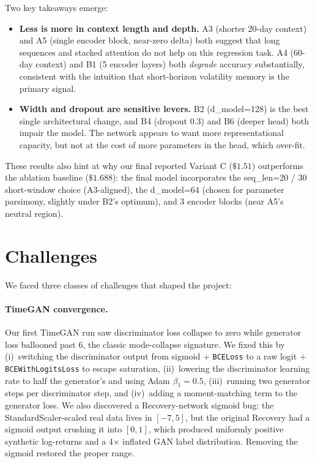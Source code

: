 \documentclass[conference]{IEEEtran}
\begin{document}
Two key takeaways emerge:
\begin{itemize}
\item \textbf{Less is more in context length and depth.} A3
(shorter 20-day context) and A5 (single encoder block, near-zero
delta) both suggest that long sequences and stacked attention
do not help on this regression task. A4 (60-day context) and
B1 (5 encoder layers) both \emph{degrade} accuracy
substantially, consistent with the intuition that short-horizon
volatility memory is the primary signal.
\item \textbf{Width and dropout are sensitive levers.} B2
(d\_model=128) is the best single architectural change, and B4
(dropout 0.3) and B6 (deeper head) both impair the model. The
network appears to want more representational capacity, but
not at the cost of more parameters in the head, which over-fit.
\end{itemize}

These results also hint at why our final reported Variant C
($\$1.51$) outperforms the ablation baseline ($\$1.688$): the
final model incorporates the seq\_len=20 / 30 short-window
choice (A3-aligned), the d\_model=64 (chosen for parameter
parsimony, slightly under B2's optimum), and 3 encoder blocks
(near A5's neutral region).

\section{Challenges}

We faced three classes of challenges that shaped the project:

\paragraph*{TimeGAN convergence.}
Our first TimeGAN run saw discriminator loss collapse to zero
while generator loss ballooned past 6, the classic
mode-collapse signature. We fixed this by (i)~switching the
discriminator output from sigmoid + \texttt{BCELoss} to a raw
logit + \texttt{BCEWithLogitsLoss} to escape saturation,
(ii)~lowering the discriminator learning rate to half the
generator's and using Adam $\beta_1 = 0.5$, (iii)~running two
generator steps per discriminator step, and (iv)~adding a
moment-matching term to the generator loss. We also discovered
a Recovery-network sigmoid bug: the StandardScaler-scaled real
data lives in $[-7, 5]$, but the original Recovery had a sigmoid
output crushing it into $[0, 1]$, which produced uniformly
positive synthetic log-returns and a 4$\times$ inflated GAN
label distribution. Removing the sigmoid restored the proper
range.
\end{document}
